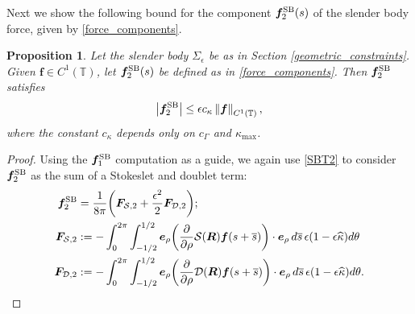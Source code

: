 \documentclass[11pt]{article}
\numberwithin{equation}{section}
\newcommand{\T}{\mathbb{T}}
\newcommand{\bars}{\overline s}
\newcommand{\be}{\bm{e}}
\newcommand{\p}{\partial}
\newcommand{\ts}{\thinspace}
\newcommand{\SB}{{\rm SB}}
\newcommand{\abs}[1]{\left\lvert #1 \right\rvert}
\newcommand{\norm}[1]{\left\lVert #1 \right\rVert}
\newcommand{\wh}[1]{\widehat{#1}}
\newcommand{\mc}[1]{\mathcal{#1}}
\newtheorem{proposition}[theorem]{Proposition}
\theoremstyle{definition}
\begin{document}
Next we show the following bound for the component $\bm{f}^{\SB}_2(s)$ of the slender body force, given by \eqref{force_components}.
\begin{proposition}\label{fSB2_est}
Let the slender body $\Sigma_\epsilon$ be as in Section \ref{geometric_constraints}. Given $\bm{f}\in C^1(\T)$, let $\bm{f}^{\SB}_2(s)$ be defined as in \eqref{force_components}. Then $\bm{f}^{\SB}_2$ satisfies 
\begin{equation}
\abs{\bm{f}^{\SB}_2 } \le \epsilon c_\kappa\norm{\bm{f}}_{C^1(\T)},
\end{equation}
where the constant $c_\kappa$ depends only on $c_{\Gamma}$ and $\kappa_{\max}$.
\end{proposition}

\begin{proof}
Using the $\bm{f}^{\SB}_1$ computation as a guide, we again use \eqref{SBT2} to consider $\bm{f}^{\SB}_2$ as the sum of a Stokeslet and doublet term: 
\begin{equation}\label{force_2}
\begin{aligned}
\bm{f}^{\SB}_2 &= \frac{1}{8\pi} \bigg(\bm{F}_{\mc{S},2} + \frac{\epsilon^2}{2}\bm{F}_{\mc{D},2} \bigg); \\
\bm{F}_{\mc{S},2} &:= -\int_0^{2\pi}\int_{-1/2}^{1/2} \be_\rho \bigg(\frac{\p}{\p\rho}\mc{S}(\bm{R})\bm{f}(s+\bars)\bigg)\cdot\be_{\rho}  \ts d\bars \ts \epsilon(1-\epsilon\wh\kappa)d\theta \\
\bm{F}_{\mc{D},2}&:=  -\int_0^{2\pi}\int_{-1/2}^{1/2} \be_\rho \bigg(\frac{\p}{\p\rho}\mc{D}(\bm{R})\bm{f}(s+\bars)\bigg)\cdot\be_{\rho}  \ts d\bars \ts \epsilon(1-\epsilon\wh\kappa)d\theta  .
\end{aligned}
\end{equation}


\end{proof}
\end{document}

